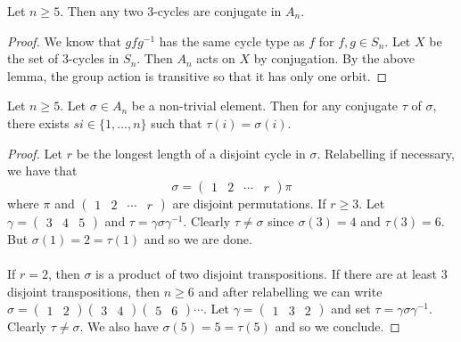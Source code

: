 \documentclass[a4paper]{article}
\begin{document}
\begin{lmm}{}{} Let $n\geq 5$. Then any two $3$-cycles are conjugate in $A_n$. \tcbline
\begin{proof}
We know that $gfg^{-1}$ has the same cycle type as $f$ for $f,g\in S_n$. Let $X$ be the set of $3$-cycles in $S_n$. Then $A_n$ acts on $X$ by conjugation. By the above lemma, the group action is transitive so that it has only one orbit. 
\end{proof}
\end{lmm}

\begin{lmm}{}{} Let $n\geq 5$. Let $\sigma\in A_n$ be a non-trivial element. Then for any conjugate $\tau$ of $\sigma$, there exists $si\in\{1,\dots,n\}$ such that $\tau(i)=\sigma(i)$. \tcbline
\begin{proof}
Let $r$ be the longest length of a disjoint cycle in $\sigma$. Relabelling if necessary, we have that $$\sigma=\begin{pmatrix}1 & 2 & \cdots & r\end{pmatrix}\pi$$ where $\pi$ and $\begin{pmatrix}1 & 2 & \cdots & r\end{pmatrix}$ are disjoint permutations. If $r\geq 3$. Let $\gamma=\begin{pmatrix}3  & 4 & 5\end{pmatrix}$ and $\tau=\gamma\sigma\gamma^{-1}$. Clearly $\tau\neq\sigma$ since $\sigma(3)=4$ and $\tau(3)=6$. But $\sigma(1)=2=\tau(1)$ and so we are done. \\~\\

If $r=2$, then $\sigma$ is a product of two disjoint transpositions. If there are at least $3$ disjoint transpositions, then $n\geq 6$ and after relabelling we can write $\sigma=\begin{pmatrix}1 & 2 \end{pmatrix}\begin{pmatrix}3 & 4 \end{pmatrix}\begin{pmatrix}5 & 6 \end{pmatrix}\cdots$. Let $\gamma=\begin{pmatrix}1 & 3 & 2 \end{pmatrix}$ and set $\tau=\gamma\sigma\gamma^{-1}$. Clearly $\tau\neq\sigma$. We also have $\sigma(5)=5=\tau(5)$ and so we conclude. 
\end{proof}
\end{lmm}
\end{document}
